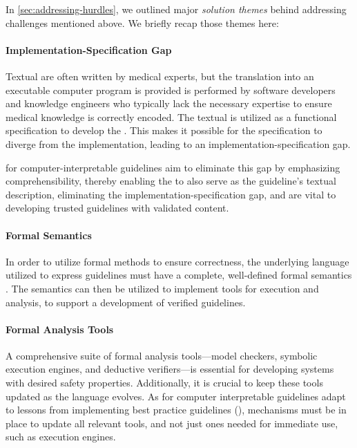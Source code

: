 In \autoref{sec:addressing-hurdles}, we outlined major
\emph{solution themes} behind addressing challenges mentioned above. We briefly
recap those themes here:

\paragraph{Implementation-Specification Gap}

Textual \BPGs{} are often written by medical experts, but
the translation into an executable computer program is
provided is performed by software developers and knowledge
engineers who typically lack the necessary expertise to ensure
medical knowledge is correctly encoded. The textual \BPG{} is
utilized as a functional specification to develop the \CDSSs{}.
This makes it possible for the specification to diverge from the
implementation, leading to an implementation-specification gap.

\DSLs{} for computer-interpretable guidelines aim to eliminate
this gap by emphasizing \HCP{} comprehensibility,
thereby enabling the \CIG{} to also serve as the guideline's
textual description, eliminating the implementation-specification gap,
and are vital to developing trusted guidelines with validated content.

\paragraph{Formal Semantics}

In order to utilize formal methods to ensure \CDSS{} correctness,
the underlying language utilized to express guidelines must have
a complete, well-defined formal semantics \cite{ShaharAMIA96}. The
semantics can then be utilized to implement tools for execution and analysis,
to support a development of verified guidelines.

\paragraph{Formal Analysis Tools}

A comprehensive suite of formal analysis tools---model checkers,
symbolic execution engines, and deductive verifiers---is essential for
developing systems with desired safety properties.
Additionally, it is crucial to keep these tools updated as the language evolves.
As \DSLs{} for computer interpretable guidelines adapt
to lessons from implementing best practice guidelines (\BPGs{}),
mechanisms must be in place to update all relevant tools, and not just
ones needed for immediate use, such as execution engines.

